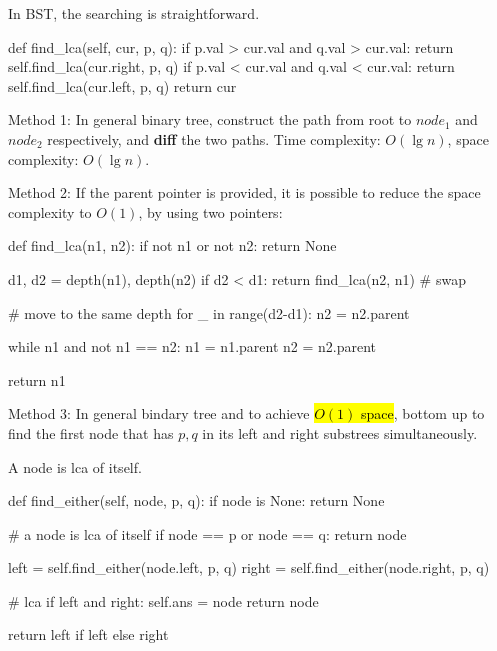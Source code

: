  In BST, the searching is straightforward. 
\begin{python}
def find_lca(self, cur, p, q):
    if p.val > cur.val and q.val > cur.val:
        return self.find_lca(cur.right, p, q)
    if p.val < cur.val and q.val < cur.val:
        return self.find_lca(cur.left, p, q)
    return cur
\end{python}

Method 1: In general binary tree, construct the path from root to $node_1$ and $node_2$ respectively, and \textbf{diff} the two paths. Time complexity: $O(\lg n)$, space complexity: $O(\lg n)$. 

Method 2: If the parent pointer is provided, it is possible to reduce the space complexity to $O(1)$, by using two pointers: 
\begin{python}
def find_lca(n1, n2):
    if not n1 or not n2:
        return None 
        
    d1, d2 = depth(n1), depth(n2)
    if d2 < d1:
        return find_lca(n2, n1)  # swap
        
    # move to the same depth 
    for _ in range(d2-d1):
        n2 = n2.parent  

    while n1 and not n1 == n2:  
        n1 = n1.parent
        n2 = n2.parent
        
    return n1
\end{python}

Method 3: In general bindary tree and to achieve \hl{$O(1)$ space}, bottom up to find the first node that has $p, q$ in its left and right substrees simultaneously.

A node is lca of itself.

\begin{python}
def find_either(self, node, p, q):
    if node is None:
        return None
    
    # a node is lca of itself
    if node == p or node == q:
        return node
    
    left = self.find_either(node.left, p, q)
    right = self.find_either(node.right, p, q)
    
    # lca
    if left and right:
    	self.ans = node
        return node
    
    return left if left else right
\end{python}

